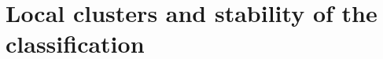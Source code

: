 \documentclass[11pt,a4paper]{article}
\begin{document}
\section{Local clusters and stability of the classification}
\begin{table}[h]\centering\small
\caption{Significant local Moran statistics for the logarithm of receipts per visit (five nearest neighbours, 9,999 conditional permutations, two-sided pseudo-$p<0.05$, unadjusted) and provinces significant in at least 25\% of 20 independent permutation runs}\label{tab:lisa}

\end{table}
\end{document}
